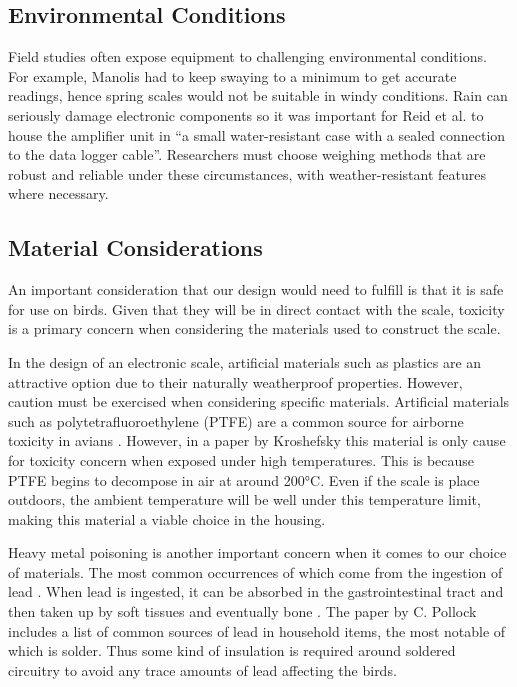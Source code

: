 \documentclass[class=report,11pt,crop=false]{standalone}
\begin{document}
\subsection{Environmental Conditions}
Field studies often expose equipment to challenging environmental conditions. For example, Manolis \cite{manoils2024simple} had to keep swaying to a minimum to get accurate readings, hence spring scales would not be suitable in windy conditions. Rain can seriously damage electronic components so it was important for Reid et al. \cite{reid1999measurement} to house the amplifier unit in “a small water-resistant case with a sealed connection to the data logger cable”. Researchers must choose weighing methods that are robust and reliable under these circumstances, with weather-resistant features where necessary.

\subsection{Material Considerations}
An important consideration that our design would need to fulfill is that it is safe for use on birds. Given that they will be in direct contact with the scale, toxicity is a primary concern when considering the materials used to construct the scale.

In the design of an electronic scale, artificial materials such as plastics are an attractive option due to their naturally weatherproof properties. However, caution must be exercised when considering specific materials. Artificial materials such as polytetrafluoroethylene (PTFE) are a common source for airborne toxicity in avians \cite{LightfootToxicity}. However, in a paper by Kroshefsky \cite{KroshefskyTeflon} this material is only cause for toxicity concern when exposed under high temperatures. This is because PTFE begins to decompose in air at around 200°C. Even if the scale is place outdoors, the ambient temperature will be well under this temperature limit, making this material a viable choice in the housing.

Heavy metal poisoning is another important concern when it comes to our choice of materials. The most common occurrences of which come from the ingestion of lead \cite{PollockHeavyMetal}. When lead is ingested, it can be absorbed in the gastrointestinal tract and then taken up by soft tissues and eventually bone \cite{PollockHeavyMetal}. The paper by C. Pollock includes a list of common sources of lead in household items, the most notable of which is solder. Thus some kind of insulation is required around soldered circuitry to avoid any trace amounts of lead affecting the birds.
\end{document}
